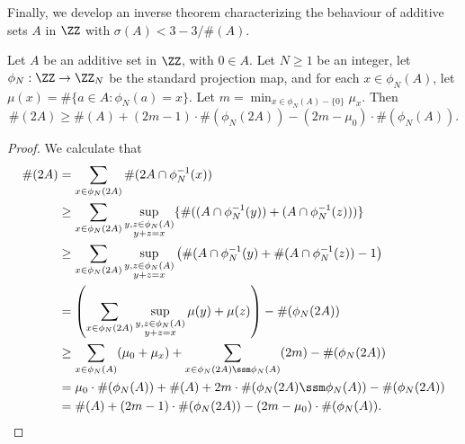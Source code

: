 Finally, we develop an inverse theorem characterizing the behaviour of additive sets $A$ in $\ZZ$ with $\sigma(A) < 3 - 3/\#(A)$.

\begin{lemma}
    Let $A$ be an additive set in $\ZZ$, with $0 \in A$. Let $N \geq 1$ be an integer, let $\phi_N: \ZZ \to \ZZ_N$ be the standard projection map, and for each $x \in \phi_N(A)$, let $\mu(x) = \#\{ a \in A: \phi_N(a) = x \}$. Let $m = \min_{x \in \phi_N(A) - \{ 0 \}} \mu_x$. Then
    \[ \#(2A) \geq \#(A) + (2m - 1) \cdot \#(\phi_N(2A)) - (2m - \mu_0) \cdot \#(\phi_N(A)). \]
\end{lemma}
\begin{proof}
    We calculate that
    \begin{align*}
        \#(2A) &= \sum_{x \in \phi_N(2A)} \#(2A \cap \phi_N^{-1}(x))\\
        &\geq \sum_{x \in \phi_N(2A)} \sup_{\substack{y,z \in \phi_N(A)\\ y + z = x}} \{ \#((A \cap \phi_N^{-1}(y)) + (A \cap \phi_N^{-1}(z))) \}\\
        &\geq \sum_{x \in \phi_N(2A)} \sup_{\substack{y,z \in \phi_N(A)\\ y + z = x}} \left( \#(A \cap \phi_N^{-1}(y) + \#(A \cap \phi_N^{-1}(z)) - 1 \right)\\
        &= \left( \sum_{x \in \phi_N(2A)} \sup_{\substack{y,z \in \phi_N(A)\\ y + z = x}} \mu(y) + \mu(z) \right) - \#(\phi_N(2A))\\
        &\geq \sum_{x \in \phi_N(A)} (\mu_0 + \mu_x) + \sum_{x \in \phi_N(2A) \ssm \phi_N(A)} (2m) - \#(\phi_N(2A))\\
        &= \mu_0 \cdot \#(\phi_N(A)) + \#(A) + 2m \cdot \#(\phi_N(2A) \ssm \phi_N(A)) - \#(\phi_N(2A))\\
        &= \#(A) + (2m - 1) \cdot \#(\phi_N(2A)) - (2m - \mu_0) \cdot \#(\phi_N(A)). \qedhere
    \end{align*}
\end{proof}

